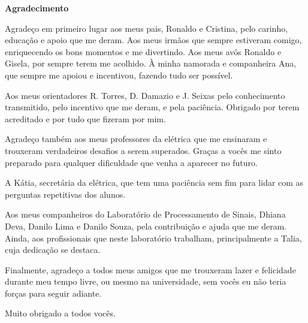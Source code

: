 \cleardoublepage

\begin{center}
\textbf{\Large Agradecimento}
\end{center}

Agradeço em primeiro lugar aos meus pais, Ronaldo e Cristina, 
pelo carinho, educação e apoio que me deram. Aos meus irmãos que sempre
estiveram comigo, enriquecendo os bons momentos e me divertindo. Aos meus 
avôs Ronaldo e Gisela, por sempre terem me acolhido. À minha namorada e 
companheira Ana, que sempre me apoiou e incentivou, fazendo tudo ser possível.

Aos meus orientadores R. Torres, D. Damazio e J. Seixas pelo conhecimento
transmitido, pelo incentivo que me deram, e pela paciência. Obrigado 
por terem acreditado e por tudo que fizeram por mim.

Agradeço também aos meus professores da elétrica que me ensinaram e trouxeram 
verdadeiros desafios a serem superados. Graças a vocês me sinto preparado para
qualquer dificuldade que venha a aparecer no futuro.

A Kátia, secretária da elétrica, que tem uma paciência sem fim para lidar com as
perguntas repetitivas dos alunos.

Aos meus companheiros do Laboratório de Processamento de Sinais, Dhiana Deva, Danilo Lima
e Danilo Souza, pela contribuição e ajuda que me deram. Ainda, aos profissionais que neste 
laboratório trabalham, principalmente a Talia, cuja dedicação se destaca.

Finalmente, agradeço a todos meus amigos que me trouxeram 
lazer e felicidade durante meu tempo livre, ou mesmo na universidade, 
sem vocês eu não teria forças para seguir adiante.

Muito obrigado a todos vocês.
